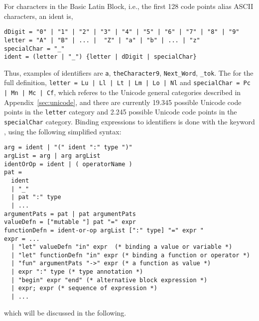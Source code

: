 For characters in the Basic Latin Block, i.e., the first 128 code points alias ASCII characters, an ident is,
%
\begin{lstlisting}[language=ebnf]
dDigit = "0" | "1" | "2" | "3" | "4" | "5" | "6" | "7" | "8" | "9"
letter = "A" | "B" | ... |  "Z" | "a" | "b" | ... | "z"
specialChar = "_"
ident = (letter | "_") {letter | dDigit | specialChar}
\end{lstlisting}
%
Thus, examples of identifiers are \lstinline{a}, \lstinline{theCharacter9}, \lstinline{Next_Word}, \lstinline{_tok}. The for the full definition, \lstinline[language=ebnf]{letter = Lu | Ll | Lt | Lm | Lo | Nl} and \lstinline[language=ebnf]{specialChar = Pc | Mn | Mc | Cf}, which referes to the Unicode general categories described in Appendix~\ref{sec:unicode}, and there are currently 19.345 possible Unicode code points in the \lstinline[language=ebnf]{letter} category and 2.245 possible Unicode code points in the \lstinline[language=ebnf]{specialChar} category.
Binding expressions to identifiers is done with the keyword , using the following simplified syntax:
%
\begin{lstlisting}[language=ebnf]
arg = ident | "(" ident ":" type ")"
argList = arg | arg argList
identOrOp = ident | ( operatorName )
pat = 
  ident 
  | "_"
  | pat ":" type
  | ...
argumentPats = pat | pat argumentPats
valueDefn = ["mutable "] pat "=" expr
functionDefn = ident-or-op argList [":" type] "=" expr "
expr = ... 
  | "let" valueDefn "in" expr  (* binding a value or variable *)
  | "let" functionDefn "in" expr (* binding a function or operator *)
  | "fun" argumentPats "->" expr (* a function as value *)
  | expr ":" type (* type annotation *)
  | "begin" expr "end" (* alternative block expression *)
  | expr; expr (* sequence of expression *)
  | ...
\end{lstlisting}
%
which will be discussed in the following.  

